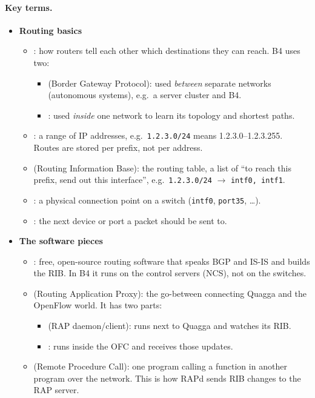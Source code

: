 \paragraph{Key terms.}
\begin{itemize}
\item \textbf{Routing basics}
  \begin{itemize}
  \item {}: how routers tell each other which destinations they can reach. B4 uses two:
    \begin{itemize}
    \item {} (Border Gateway Protocol): used \emph{between} separate networks (autonomous systems), e.g.\ a server cluster and B4.
    \item {}: used \emph{inside} one network to learn its topology and shortest paths.
    \end{itemize}
  \item {}: a range of IP addresses, e.g.\ \texttt{1.2.3.0/24} means 1.2.3.0--1.2.3.255. Routes are stored per prefix, not per address.
  \item {} (Routing Information Base): the routing table, a list of ``to reach this prefix, send out this interface'', e.g.\ \texttt{1.2.3.0/24} $\to$ \texttt{intf0, intf1}.
  \item {}: a physical connection point on a switch (\texttt{intf0}, \texttt{port35}, \dots).
  \item {}: the next device or port a packet should be sent to.
  \end{itemize}
\item \textbf{The software pieces}
  \begin{itemize}
  \item {}: free, open-source routing software that speaks BGP and IS-IS and builds the RIB. In B4 it runs on the control servers (NCS), not on the switches.
  \item {} (Routing Application Proxy): the go-between connecting Quagga and the OpenFlow world. It has two parts:
    \begin{itemize}
    \item {} (RAP daemon/client): runs next to Quagga and watches its RIB.
    \item {}: runs inside the OFC and receives those updates.
    \end{itemize}
  \item {} (Remote Procedure Call): one program calling a function in another program over the network. This is how RAPd sends RIB changes to the RAP server.

\end{itemize}
\end{itemize}
